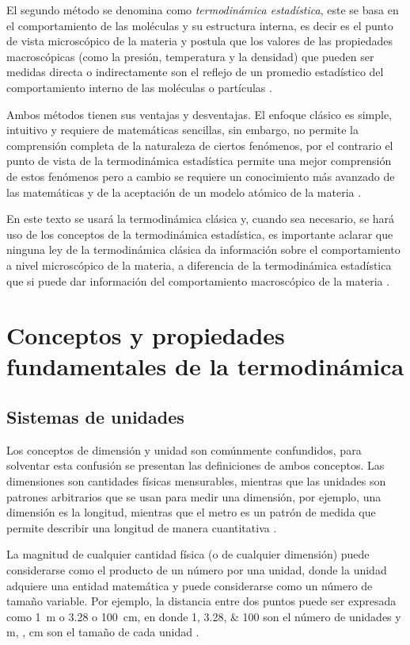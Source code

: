 \documentclass[../master.tex]{subfiles}
\begin{document}
El segundo método se denomina como \emph{termodinámica estadística}, este se basa en el comportamiento de las moléculas y su estructura interna, es decir es el punto de vista microscópico de la materia y postula que los valores de las propiedades macroscópicas (como la presión, temperatura y la densidad) que pueden ser medidas directa o indirectamente son el reflejo de un promedio estadístico del comportamiento interno de las moléculas o partículas \parencites{faires}{wark}.

Ambos métodos tienen sus ventajas y desventajas. El enfoque clásico es simple, intuitivo y requiere de matemáticas sencillas, sin embargo, no permite la comprensión completa de la naturaleza de ciertos fenómenos, por el contrario el punto de vista de la termodinámica estadística permite una mejor comprensión de estos fenómenos pero a cambio se requiere un conocimiento más avanzado de las matemáticas y de la aceptación de un modelo atómico de la materia \parencite{faires}.

En este texto se usará la termodinámica clásica y, cuando sea necesario, se hará uso de los conceptos de la termodinámica estadística, es importante aclarar que ninguna ley de la termodinámica clásica da información sobre el comportamiento a nivel microscópico de la materia, a diferencia de la termodinámica estadística que si puede dar información del comportamiento macroscópico de la materia \parencite{smith-vanness}.

\section{Conceptos y propiedades fundamentales de la termodinámica}

\subsection{Sistemas de unidades}

Los conceptos de dimensión y unidad son comúnmente confundidos, para solventar esta confusión se presentan las definiciones de ambos conceptos. Las dimensiones son cantidades físicas mensurables, mientras que las unidades son patrones arbitrarios que se usan para medir una dimensión, por ejemplo, una dimensión es la longitud, mientras que el metro es un patrón de medida que permite describir una longitud de manera cuantitativa \parencites{rubenstein}{doran}.


La magnitud de cualquier cantidad física (o de cualquier dimensión) puede considerarse como el producto de un número por una unidad, donde la unidad adquiere una entidad matemática y puede considerarse como un número de tamaño variable. Por ejemplo, la distancia entre dos puntos puede ser expresada como \qty{1}{\metre} o \qty{3.28}{\feet} o \qty{100}{\centi\metre}, en donde \numlist{1;3.28;100} son el número de unidades y \unit{m}, \unit{\feet}, \unit{\centi\metre} son el tamaño de cada unidad \parencite{coulson1}.
\end{document}
